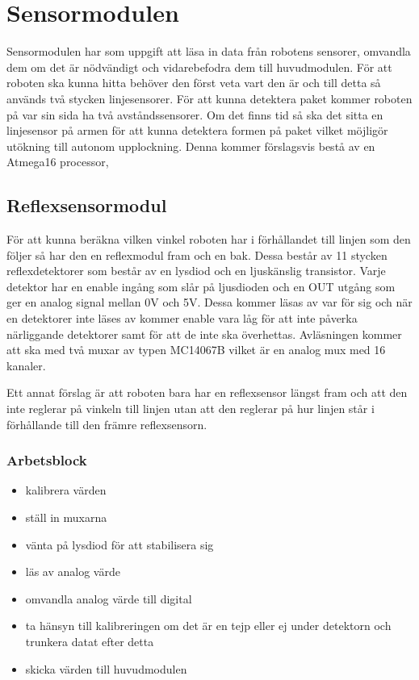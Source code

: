 %

\section{Sensormodulen}
Sensormodulen har som uppgift att läsa in data från robotens sensorer, omvandla dem om det är nödvändigt och vidarebefodra dem till huvudmodulen. För att roboten ska kunna hitta behöver den först veta vart den är och till detta så används två stycken linjesensorer. För att kunna detektera paket kommer roboten på var sin sida ha två avståndssensorer. Om det finns tid så ska det sitta en linjesensor på armen för att kunna detektera formen på paket vilket möjligör utökning till autonom upplockning. Denna kommer förslagsvis bestå av en Atmega16 processor,

\subsection{Reflexsensormodul}
För att kunna beräkna vilken vinkel roboten har i förhållandet till linjen som den följer så har den en reflexmodul fram och en bak. Dessa består av 11 stycken reflexdetektorer som består av en lysdiod och en ljuskänslig transistor. Varje detektor har en enable ingång som slår på ljusdioden och en OUT utgång som ger en analog signal mellan 0V och 5V. Dessa kommer läsas av var för sig och när en detektorer inte läses av kommer enable vara låg för att inte påverka närliggande detektorer samt för att de inte ska överhettas. Avläsningen kommer att ska med två muxar av typen MC14067B vilket är en analog mux med 16 kanaler.

Ett annat förslag är att roboten bara har en reflexsensor längst fram och att den inte reglerar på vinkeln till linjen utan att den reglerar på hur linjen står i förhållande till den främre reflexsensorn.
\subsubsection{Arbetsblock}
\begin{itemize}
\item kalibrera värden
\item ställ in muxarna
\item vänta på lysdiod för att stabilisera sig
\item läs av analog värde
\item omvandla analog värde till digital
\item ta hänsyn till kalibreringen om det är en tejp eller ej under detektorn och trunkera datat efter detta
\item skicka värden till huvudmodulen
\end{itemize}
